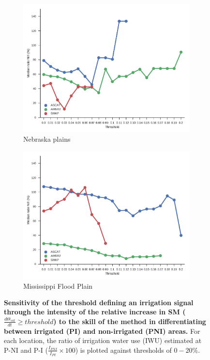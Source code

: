 \documentclass[hess, manuscript]{copernicus}
\begin{document}
\begin{figure}
\begin{subfigure}[t]{0.49\textwidth}
   \end{subfigure}
   \hfill
   \begin{subfigure}[t]{0.49\textwidth}
       \centering
       \includegraphics[width=\textwidth]{figures/methods/Nebraska_precmask_True}
       \caption{Nebraska plains}
       \label{fig:sensitivity-analysis-NPS}
   \end{subfigure}
   \hfill
   \begin{subfigure}[t]{0.49\textwidth}
       \centering
       \includegraphics[width=\textwidth]{figures/methods/Mississippi_Delta_precmask_True}
       \caption{Mississippi Flood Plain}
       \label{fig:sensitivity-analysis-MFP}
   \end{subfigure} 
   \caption{\textbf{Sensitivity of the threshold defining an irrigation signal through the intensity of the relative increase in SM ($\frac{d \Theta_{sat}}{dt} \geq threshold$) to the skill of the method in differentiating between irrigated (PI) and non-irrigated (PNI) areas.} For each location, the ratio of irrigation water use (IWU) estimated at P-NI and P-I ($\frac{I_{PNI}}{I_{PI}} \times 100$) is plotted against thresholds of $0-20\%$.}
   \label{fig:sensitivity-analysis}
\end{figure}
\end{document}
